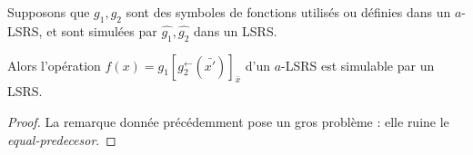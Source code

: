 \documentclass{report}
\newcommand{\eqpredf}[4]{#1\left[ #2^{\leftarrow}(#3) \right]_{#4}} %
\begin{document}
	\begin{lemma}
		Supposons que $g_1, g_2$ sont des symboles de fonctions utilisés ou définies dans un $a$-LSRS, et sont simulées par $\hat{g_1},\hat{g_2}$ dans un LSRS.
		
		Alors l'opération $f(x) = \eqpredf{g_1}{g_2}{\bar{x'}}{\bar{x}}$ d'un $a$-LSRS est simulable par un LSRS.
	\end{lemma}
	
	\begin{proof}
		La remarque donnée précédemment pose un gros problème : elle ruine le \emph{equal-predecesor}.
	\end{proof}
	
	
	
	
	
	
	
	
	
	
	
	
	
	
	
	
	
\end{document}
